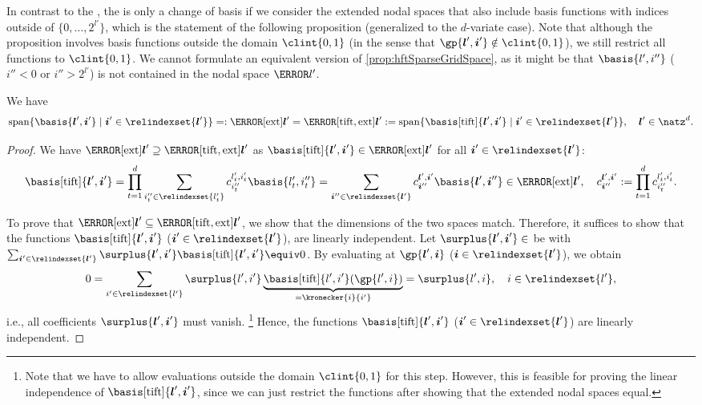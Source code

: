 In contrast to the \hftr, the \tiftr is only a change of basis
if we consider the extended nodal spaces that also include
basis functions with indices outside of $\{0, \dotsc, 2^{l'}\}$,
which is the statement of the following proposition
(generalized to the $d$-variate case).
Note that although the proposition involves basis functions outside
the domain $\clint{0, 1}$
(in the sense that $\gp{\*l',\*i'} \notin \clint{0, 1}$),
we still restrict all functions to $\clint{0, 1}$.
We cannot formulate an equivalent version of \cref{prop:hftSparseGridSpace},
as it might be that $\basis{l',i''}$ ($i'' < 0$ or $i'' > 2^{l'}$)
is not contained in the nodal space $\ns{l'}$.

\begin{proposition}
  \label{prop:tiftNodalSpace}
  We have
  \begin{equation}
    \spn\{\basis{\*l',\*i'} \mid \*i' \in \relindexset{\*l'}\}
    =: \ns[\ext]{\*l'}
    = \ns[\tift,\ext]{\*l'}
    := \spn\{\basis[\tift]{\*l',\*i'} \mid \*i' \in \relindexset{\*l'}\},\quad
    \*l' \in \natz^d.
  \end{equation}
\end{proposition}

\begin{proof}
  We have $\ns[\ext]{\*l'} \supset \ns[\tift,\ext]{\*l'}$ as
  $\basis[\tift]{\*l',\*i'} \in \ns[\ext]{\*l'}$
  for all $\*i' \in \relindexset{\*l'}$:
  \begin{equation}
    \basis[\tift]{\*l',\*i'}
    = \prod_{t=1}^d \sum_{i''_t \in \relindexset{l'_t}}
    c_{i''_t}^{l'_t,i'_t} \basis{l'_t,i''_t}
    = \sum_{\*i'' \in \relindexset{\*l'}}
    c_{\*i''}^{\*l',\*i'} \basis{\*l',\*i''}
    \in \ns[\ext]{\*l'},\quad
    c_{\*i''}^{\*l',\*i'}
    := \prod_{t=1}^d c_{i''_t}^{l'_t,i'_t}.
  \end{equation}
  
  To prove that
  $\ns[\ext]{\*l'} \subset \ns[\tift,\ext]{\*l'}$,
  we show that the dimensions of the two spaces match.
  Therefore, it suffices to show that
  the functions $\basis[\tift]{\*l',\*i'}$ ($\*i' \in \relindexset{\*l'}$),
  are linearly independent.
  Let $\surplus{\*l',\*i'} \in \real$ be with
  $\sum_{\*i' \in \relindexset{\*l'}}
  \surplus{\*l',\*i'} \basis[\tift]{\*l',\*i'} \equiv 0$.
  By evaluating at $\gp{\*l',\*i}$ ($\*i \in \relindexset{\*l'}$), we obtain
  \begin{equation}
    0
    = \sum_{\*i' \in \relindexset{\*l'}} \surplus{\*l',\*i'}
    \underbrace{\basis[\tift]{\*l',\*i'}(\gp{\*l',\*i})}_{=\kronecker{\*i}{\*i'}}
    = \surplus{\*l',\*i},\quad
    \*i \in \relindexset{\*l'},
  \end{equation}
  i.e., all coefficients $\surplus{\*l',\*i'}$ must vanish.%
  \footnote{%
    Note that we have to allow evaluations outside the
    domain $\clint{0, 1}$ for this step.
    However, this is feasible for proving the linear independence
    of $\basis[\tift]{\*l',\*i'}$, since we can just restrict the functions
    after showing that the extended nodal spaces equal.%
  }
  Hence, the functions $\basis[\tift]{\*l',\*i'}$ ($\*i' \in \relindexset{\*l'}$)
  are linearly independent.
\end{proof}



